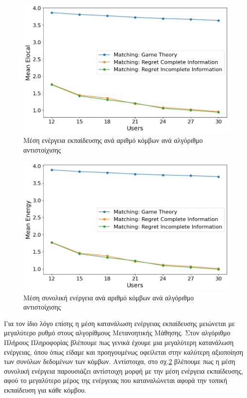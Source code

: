 \newpage

\begin{figure}[H]
    \centering
    \includegraphics[width=\textwidth]{figures/chapter4/Mean_Elocal_vs_Users.png}
    \caption{Μέση ενέργεια εκπαίδευσης ανά αριθμό κόμβων ανά αλγόριθμο αντιστοίχισης}
    \label{fig35}
\end{figure}

\begin{figure}[H]
    \centering
    \includegraphics[width=\textwidth]{figures/chapter4/Mean_Energy_vs_Users.png}
    \caption{Μέση συνολική ενέργεια ανά αριθμό κόμβων ανά αλγόριθμο αντιστοίχισης}
    \label{fig36}
\end{figure}

\newpage

Για τον ίδιο λόγο επίσης η μέση κατανάλωση ενέργειας εκπαίδευσης μειώνεται με μεγαλύτερο ρυθμό στους αλγορίθμους Μετανοητικής Μάθησης. Στον αλγόριθμο Πλήρους Πληροφορίας βλέπουμε πως γενικά έχουμε μια μεγαλύτερη κατανάλωση ενέργειας, όπου όπως είδαμε και προηγουμένως οφείλεται στην καλύτερη αξιοποίηση των συνόλων δεδομένων των κόμβων. Αντίστοιχα, στο σχ.\ref{fig36} βλέπουμε πως η μέση συνολική ενέργεια παρουσιάζει αντίστοιχη μορφή με την μέση ενέργεια εκπαίδευσης, αφού το μεγαλύτερο μέρος της ενέργειας που καταναλώνεται αφορά την τοπική εκπαίδευση για κάθε κόμβου.

